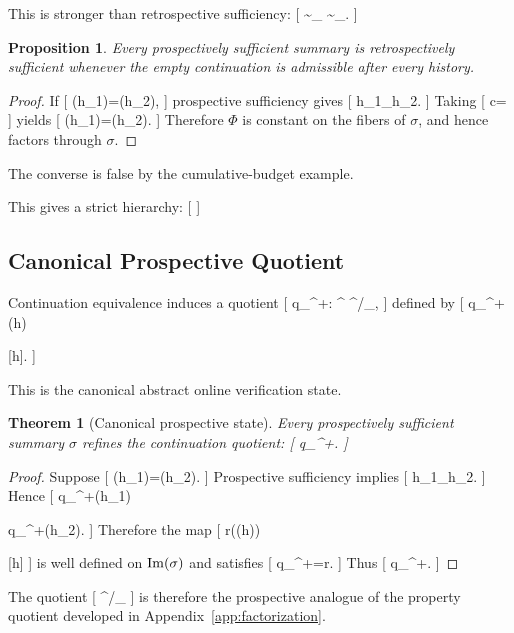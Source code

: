 \documentclass[11pt]{article}
\newtheorem{theorem}{Theorem} \newtheorem{proposition}{Proposition} \newtheorem{lemma}{Lemma} \newtheorem{corollary}{Corollary} \newtheorem{definition}{Definition} \newtheorem{remark}{Remark}
\begin{document}
This is stronger than retrospective sufficiency:
[
\sim_\sigma
\subseteq
\sim_\Phi.
]

\begin{proposition}
Every prospectively sufficient summary is retrospectively sufficient whenever the empty continuation is admissible after every history.
\end{proposition}

\begin{proof}
If
[
\sigma(h_1)=\sigma(h_2),
]
prospective sufficiency gives
[
h_1\equiv_\Phi h_2.
]
Taking
[
c=\epsilon
]
yields
[
\Phi(h_1)=\Phi(h_2).
]
Therefore $\Phi$ is constant on the fibers of $\sigma$, and hence factors through $\sigma$.
\end{proof}

The converse is false by the cumulative-budget example.

This gives a strict hierarchy:
[
]

\subsection{Canonical Prospective Quotient}

Continuation equivalence induces a quotient
[
q_\Phi^{+}:
\Sigma^\ast
\to
\Sigma^\ast/{\equiv_\Phi},
]
defined by
[
q_\Phi^{+}(h)

[h]{\equiv\Phi}.
]

This is the canonical abstract online verification state.

\begin{theorem}[Canonical prospective state]
Every prospectively sufficient summary $\sigma$ refines the continuation quotient:
[
\sigma\succeq q_\Phi^{+}.
]
\end{theorem}

\begin{proof}
Suppose
[
\sigma(h_1)=\sigma(h_2).
]
Prospective sufficiency implies
[
h_1\equiv_\Phi h_2.
]
Hence
[
q_\Phi^{+}(h_1)

q_\Phi^{+}(h_2).
]
Therefore the map
[
r(\sigma(h))

[h]{\equiv\Phi}
]
is well defined on $\operatorname{Im}(\sigma)$ and satisfies
[
q_\Phi^{+}=r\circ\sigma.
]
Thus
[
\sigma\succeq q_\Phi^{+}.
]
\end{proof}

The quotient
[
\Sigma^\ast/{\equiv_\Phi}
]
is therefore the prospective analogue of the property quotient developed in Appendix~\ref{app:factorization}.
\end{document}

